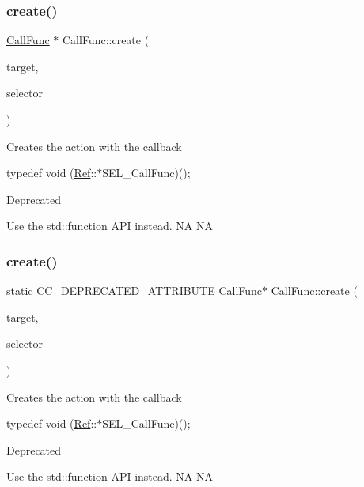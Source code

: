 \subsubsection{\texorpdfstring{create()}{create()}\hspace{0.1cm}{\footnotesize\ttfamily [3/4]}}
{\footnotesize\ttfamily \hyperlink{classCallFunc}{Call\+Func} $\ast$ Call\+Func\+::create (\begin{DoxyParamCaption}\item[{\hyperlink{classRef}{Ref} $\ast$}]{target,  }\item[{S\+E\+L\+\_\+\+Call\+Func}]{selector }\end{DoxyParamCaption})\hspace{0.3cm}{\ttfamily [static]}}

Creates the action with the callback

typedef void (\hyperlink{classRef}{Ref}\+:\+:$\ast$\+S\+E\+L\+\_\+\+Call\+Func)(); \begin{DoxyRefDesc}{Deprecated}
\item[\hyperlink{deprecated__deprecated000013}{Deprecated}]Use the std\+::function A\+PI instead.  NA  NA \end{DoxyRefDesc}
\mbox{\label{classCallFunc_a84431b4446e35dcf16647c651235f722}} 
\subsubsection{\texorpdfstring{create()}{create()}\hspace{0.1cm}{\footnotesize\ttfamily [4/4]}}
{\footnotesize\ttfamily static C\+C\+\_\+\+D\+E\+P\+R\+E\+C\+A\+T\+E\+D\+\_\+\+A\+T\+T\+R\+I\+B\+U\+TE \hyperlink{classCallFunc}{Call\+Func}$\ast$ Call\+Func\+::create (\begin{DoxyParamCaption}\item[{\hyperlink{classRef}{Ref} $\ast$}]{target,  }\item[{S\+E\+L\+\_\+\+Call\+Func}]{selector }\end{DoxyParamCaption})\hspace{0.3cm}{\ttfamily [static]}}

Creates the action with the callback

typedef void (\hyperlink{classRef}{Ref}\+:\+:$\ast$\+S\+E\+L\+\_\+\+Call\+Func)(); \begin{DoxyRefDesc}{Deprecated}
\item[\hyperlink{deprecated__deprecated000243}{Deprecated}]Use the std\+::function A\+PI instead.  NA  NA \end{DoxyRefDesc}
\mbox{\label{classCallFunc_a9a66dcb09103983ddab2ee2c89ae5c0e}} 
